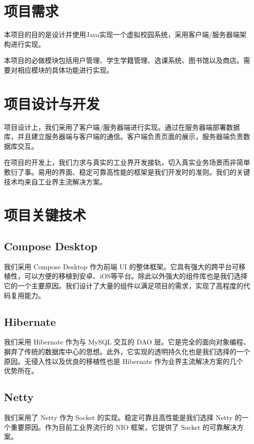 \documentclass{article}
\begin{document}
\section{项目需求}

本项目的目的是设计并使用Java实现一个虚拟校园系统，采用客户端/服务器端架构进行实现。

本项目的必做模块包括用户管理、学生学籍管理、选课系统、图书馆以及商店。需要对相应模块的具体功能进行实现。

\section{项目设计与开发}

项目设计上，我们采用了客户端/服务器端进行实现。通过在服务器端部署数据库，并且建立服务器端与客户端的通信。客户端负责页面的展示，服务器端负责数据库交互。

在项目的开发上，我们力求与真实的工业界开发接轨，切入真实业务场景而非简单敷衍了事。易用的界面、稳定可靠高性能的框架是我们开发时的准则。我们的关键技术均来自工业界主流解决方案。

\section{项目关键技术}

\subsection{Compose Desktop}

我们采用 Compose Desktop 作为前端 UI 的整体框架。它具有强大的跨平台可移植性，可以方便的移植到安卓、iOS等平台。除此以外强大的组件库也是我们选择它的一个主要原因。我们设计了大量的组件以满足项目的需求，实现了高程度的代码复用能力。

\subsection{Hibernate}

我们采用 Hibernate 作为与 MySQL 交互的 DAO 层。它是完全的面向对象编程、摒弃了传统的数据库中心的思想。此外，它实现的透明持久化也是我们选择的一个原因。无侵入性以及优良的移植性也是 Hibernate 作为业界主流解决方案的几个优势所在。

\subsection{Netty}

我们采用了 Netty 作为 Socket 的实现。稳定可靠且高性能是我们选择 Netty 的一个重要原因。作为目前工业界流行的 NIO 框架，它提供了 Socket 的可靠解决方案。
\end{document}

